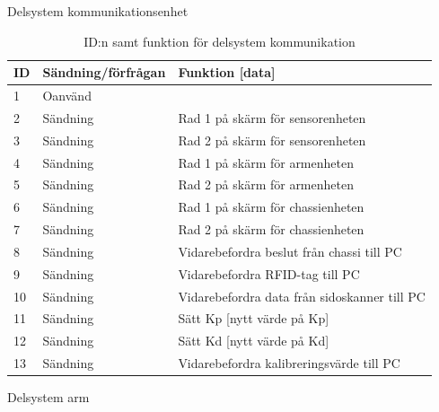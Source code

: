 Delsystem kommunikationsenhet

\begin{table}[H]
\centering
\label{callbacks-komm}
\begin{tabularx}{\textwidth}{|l|l|X|}
\hline
\textbf{ID} & \textbf{Sändning/förfrågan} & \textbf{Funktion [data]} \\ \hline
1 & Oanvänd & \\ \hline
2 & Sändning & Rad 1 på skärm för sensorenheten \\ \hline
3 & Sändning & Rad 2 på skärm för sensorenheten \\ \hline
4 & Sändning & Rad 1 på skärm för armenheten \\ \hline
5 & Sändning & Rad 2 på skärm för armenheten \\ \hline
6 & Sändning & Rad 1 på skärm för chassienheten \\ \hline
7 & Sändning & Rad 2 på skärm för chassienheten \\ \hline
8 & Sändning & Vidarebefordra beslut från chassi till PC \\ \hline
9 & Sändning & Vidarebefordra RFID-tag till PC\\ \hline
10 & Sändning & Vidarebefordra data från sidoskanner till PC \\ \hline
11 & Sändning & Sätt Kp [nytt värde på Kp] \\ \hline
12 & Sändning & Sätt Kd [nytt värde på Kd] \\ \hline
13 & Sändning & Vidarebefordra kalibreringsvärde till PC \\ \hline
\end{tabularx}
\caption{ID:n samt funktion för delsystem kommunikation}
\end{table}

Delsystem arm

